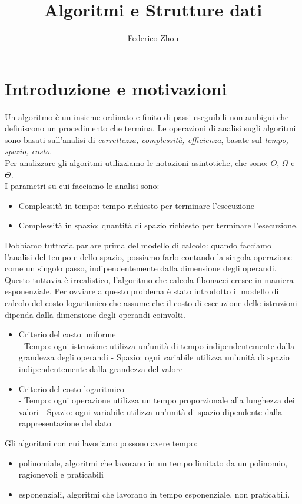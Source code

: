 \documentclass[11pt, oneside]{article}   	%
\title{Algoritmi e Strutture dati}
\author{Federico Zhou}
\begin{document}
\maketitle
\section{Introduzione e motivazioni}
Un algoritmo è un insieme ordinato e finito di passi eseguibili non ambigui che definiscono un procedimento che termina. Le operazioni di analisi sugli algoritmi sono basati sull'analisi di \emph{correttezza, complessità, efficienza}, basate sul \emph{tempo, spazio, costo}.\\
Per analizzare gli algoritmi utilizziamo le notazioni asintotiche, che sono: $O$, $\Omega$ e $\Theta$.\\
I parametri su cui facciamo le analisi sono:
\begin{itemize}
\item Complessità in tempo: tempo richiesto per terminare l'esecuzione
\item Complessità in spazio: quantità di spazio richiesto per terminare l'esecuzione.
\end{itemize}
Dobbiamo tuttavia parlare prima del modello di calcolo: quando facciamo l'analisi del tempo e dello spazio, possiamo farlo contando la singola operazione come un singolo passo, indipendentemente dalla dimensione degli operandi. Questo tuttavia è irrealistico, l'algoritmo che calcola fibonacci cresce in maniera esponenziale. Per ovviare a questo problema è stato introdotto il modello di calcolo del costo logaritmico che assume che il costo di esecuzione delle istruzioni dipenda dalla dimensione degli operandi coinvolti.
\begin{itemize}
\item Criterio del costo uniforme\\
- Tempo: ogni istruzione utilizza un'unità di tempo indipendentemente dalla grandezza degli operandi
- Spazio: ogni variabile utilizza un'unità di spazio indipendentemente dalla grandezza del valore
\item Criterio del costo logaritmico\\
- Tempo: ogni operazione utilizza un tempo proporzionale alla lunghezza dei valori 
- Spazio: ogni variabile utilizza un'unità di spazio dipendente dalla rappresentazione del dato
\end{itemize}
Gli algoritmi con cui lavoriamo possono avere tempo:
\begin{itemize}
\item polinomiale, algoritmi che lavorano in un tempo limitato da un polinomio, ragionevoli e praticabili
\item esponenziali, algoritmi che lavorano in tempo esponenziale, non praticabili.
\end{itemize}
\end{document}
